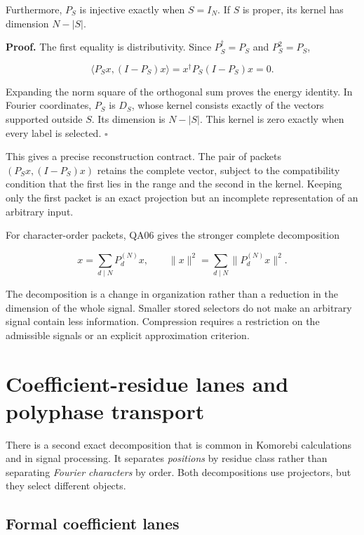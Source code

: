 Furthermore, \(P_S\) is injective exactly when \(S=I_N\). If \(S\) is
proper, its kernel has dimension \(N-|S|\).

\textbf{Proof.} The first equality is distributivity. Since
\(P_S^\dagger=P_S\) and \(P_S^2=P_S\),

\[
\langle P_Sx,(I-P_S)x\rangle
=x^\dagger P_S(I-P_S)x=0.
\]

Expanding the norm square of the orthogonal sum proves the energy
identity. In Fourier coordinates, \(P_S\) is \(D_S\), whose kernel
consists exactly of the vectors supported outside \(S\). Its dimension
is \(N-|S|\). This kernel is zero exactly when every label is selected.
\(\square\)

This gives a precise reconstruction contract. The pair of packets
\((P_Sx,(I-P_S)x)\) retains the complete vector, subject to the
compatibility condition that the first lies in the range and the second
in the kernel. Keeping only the first packet is an exact projection but
an incomplete representation of an arbitrary input.

For character-order packets, QA06 gives the stronger complete
decomposition

\[
x=\sum_{d\mid N}P_d^{(N)}x,
\qquad
\|x\|^2=\sum_{d\mid N}\|P_d^{(N)}x\|^2.
\]

The decomposition is a change in organization rather than a reduction in
the dimension of the whole signal. Smaller stored selectors do not make
an arbitrary signal contain less information. Compression requires a
restriction on the admissible signals or an explicit approximation
criterion.

\hypertarget{q:coefficient-residue-lanes-and-polyphase-transport}{%
\section{Coefficient-residue lanes and polyphase
transport}\label{q:coefficient-residue-lanes-and-polyphase-transport}}

There is a second exact decomposition that is common in Komorebi
calculations and in signal processing. It separates \emph{positions} by
residue class rather than separating \emph{Fourier characters} by order.
Both decompositions use projectors, but they select different objects.

\hypertarget{q:formal-coefficient-lanes}{%
\subsection{Formal coefficient
lanes}\label{q:formal-coefficient-lanes}}

